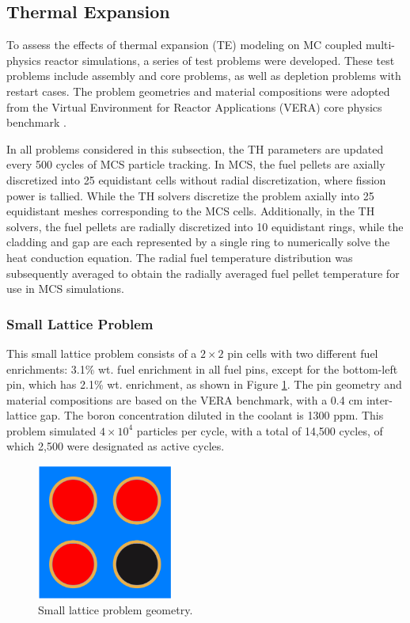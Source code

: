\subsection{Thermal Expansion} \label{sec42}

To assess the effects of thermal expansion (TE) modeling on MC coupled multi-physics reactor simulations, a series of test problems were developed. These test problems include assembly and core problems, as well as depletion problems with restart cases. The problem geometries and material compositions were adopted from the Virtual Environment for Reactor Applications (VERA) core physics benchmark \cite{godfrey}.

In all problems considered in this subsection, the TH parameters are updated every 500 cycles of MCS particle tracking. In MCS, the fuel pellets are axially discretized into 25 equidistant cells without radial discretization, where fission power is tallied. While the TH solvers discretize the problem axially into 25 equidistant meshes corresponding to the MCS cells. Additionally, in the TH solvers, the fuel pellets are radially discretized into 10 equidistant rings, while the cladding and gap are each represented by a single ring to numerically solve the heat conduction equation. The radial fuel temperature distribution was subsequently averaged to obtain the radially averaged fuel pellet temperature for use in MCS simulations.


\subsubsection{Small Lattice Problem}

This small lattice problem consists of a $2\times2$ pin cells with two different fuel enrichments: 3.1\% wt. fuel enrichment in all fuel pins, except for the bottom-left pin, which has 2.1\% wt. enrichment, as shown in Figure \ref{fig_42a}. The pin geometry and material compositions are based on the VERA benchmark, with a 0.4 cm inter-lattice gap. The boron concentration diluted in the coolant is 1300 ppm. This problem simulated $4\times10^4$ particles per cycle, with a total of 14,500 cycles, of which 2,500 were designated as active cycles.

\begin{figure}[h]
    \centering
    \includegraphics[width=0.4\textwidth]{figs/xy_plot_noGrid.pdf}
    \caption{Small lattice problem geometry.}
    \label{fig_42a}
\end{figure}

